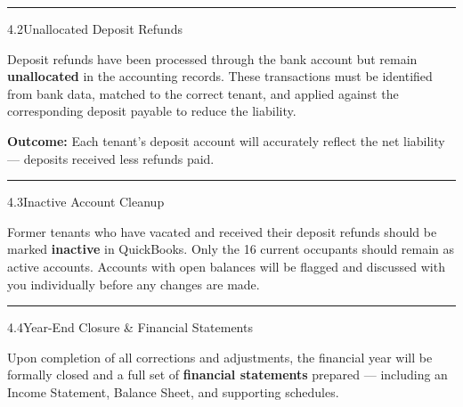 \documentclass[a4paper,11pt]{article}
\begin{document}
\vspace{10pt}
{\fontsize{11pt}{11pt}\selectfont\latosemibold\color{navy}\hspace{2pt}\textcolor{gold}{\rule{2.5pt}{11pt}}\hspace{8pt}4.2\;\;Unallocated Deposit Refunds}

\vspace{6pt}
{\color{textbody}\fontsize{10.5pt}{16pt}\selectfont
Deposit refunds have been processed through the bank account but remain \textbf{unallocated} in the accounting records. These transactions must be identified from bank data, matched to the correct tenant, and applied against the corresponding deposit payable to reduce the liability.}

\vspace{4pt}
\begin{tcolorbox}[colback=goldlight, colframe=goldlight, boxrule=0pt, left=4mm, right=4mm, top=3mm, bottom=3mm, borderline west={3pt}{0pt}{gold}]
{\color{textbody}\fontsize{9pt}{14pt}\selectfont\textbf{\checkmark\;Outcome:} Each tenant's deposit account will accurately reflect the net liability --- deposits received less refunds paid.}
\end{tcolorbox}

\vspace{10pt}
{\fontsize{11pt}{11pt}\selectfont\latosemibold\color{navy}\hspace{2pt}\textcolor{gold}{\rule{2.5pt}{11pt}}\hspace{8pt}4.3\;\;Inactive Account Cleanup}

\vspace{6pt}
{\color{textbody}\fontsize{10.5pt}{16pt}\selectfont
Former tenants who have vacated and received their deposit refunds should be marked \textbf{inactive} in QuickBooks. Only the 16 current occupants should remain as active accounts. Accounts with open balances will be flagged and discussed with you individually before any changes are made.}

\vspace{10pt}
{\fontsize{11pt}{11pt}\selectfont\latosemibold\color{navy}\hspace{2pt}\textcolor{gold}{\rule{2.5pt}{11pt}}\hspace{8pt}4.4\;\;Year-End Closure \& Financial Statements}

\vspace{6pt}
{\color{textbody}\fontsize{10.5pt}{16pt}\selectfont
Upon completion of all corrections and adjustments, the financial year will be formally closed and a full set of \textbf{financial statements} prepared --- including an Income Statement, Balance Sheet, and supporting schedules.}
\end{document}
